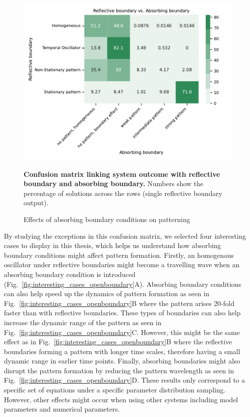 \begin{figure}[H] %
    \centering
    \begin{adjustbox}{center}
        \includegraphics[width=1\textwidth]{chapters/Chapter 1/nogrowth_openboundary_confusion_variant0-11-12} %
    \end{adjustbox}
    \caption{\textbf{Confusion matrix linking system outcome with reflective boundary and absorbing boundary.} Numbers show the percentage of solutions across the rows (single reflective boundary output). }
    \caption{Effects of absorbing boundary conditions on patterning}
    \label{fig:nogrowth_openboundary_confusion_variant0} %
\end{figure}

By studying the exceptions in this confusion matrix, we selected four interesting cases to display in this thesis, which helps us understand how absorbing boundary conditions might affect pattern formation.
Firstly, an homogenous oscillator under reflective boundaries might become a travelling wave when an absorbing boundary condition is introduced (Fig.~\ref{fig:interesting_cases_openboundary}A).
Absorbing boundary conditions can also help speed up the dynamics of pattern formation as seen in Fig.~\ref{fig:interesting_cases_openboundary}B where the pattern arises 20-fold faster than with reflective boundaries.
These types of boundaries can also help increase the dynamic range of the pattern as seen in Fig.~\ref{fig:interesting_cases_openboundary}C.
However, this might be the same effect as in Fig.~\ref{fig:interesting_cases_openboundary}B where the reflective boundaries forming a pattern with longer time scales, therefore having a small dynamic range in earlier time points.
Finally, absorbing boundaries might also disrupt the pattern formation by reducing the pattern wavelength as seen in Fig.~\ref{fig:interesting_cases_openboundary}D.
These results only correspond to a specific set of equations under a specific parameter distribution sampling.
However, other effects might occur when using other systems including model parameters and numerical parameters.

